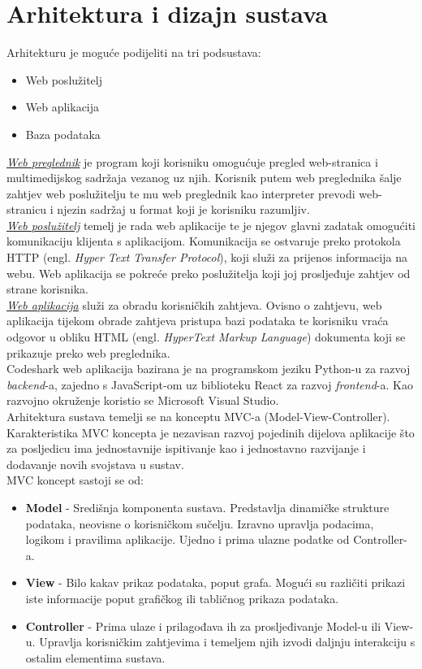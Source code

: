 \chapter{Arhitektura i dizajn sustava}
		
		\noindent Arhitekturu je moguće podijeliti na tri podsustava:
	\begin{itemize}
		\item 	Web poslužitelj
		\item 	Web aplikacija
		\item 	Baza podataka	
	\end{itemize}
		
		\underline{\textit{Web preglednik}} je program koji korisniku omogućuje pregled web-stranica i multimedijskog sadržaja vezanog uz njih. Korisnik putem web preglednika šalje zahtjev web poslužitelju te mu web preglednik kao interpreter prevodi web-stranicu i njezin sadržaj u format koji je korisniku razumljiv. \\
		\underline{\textit{Web poslužitelj}} temelj je rada web aplikacije te je njegov glavni zadatak omogućiti komunikaciju klijenta s aplikacijom. Komunikacija se ostvaruje preko protokola HTTP (engl. \textit{Hyper Text Transfer Protocol}), koji služi za prijenos informacija na webu. Web aplikacija se pokreće preko poslužitelja koji joj prosljeđuje zahtjev od strane korisnika. \\
		\underline{\textit{Web aplikacija}} služi za obradu korisničkih zahtjeva. Ovisno o zahtjevu, web aplikacija tijekom obrade zahtjeva pristupa bazi podataka te korisniku vraća odgovor u obliku HTML (engl. \textit{HyperText Markup Language}) dokumenta koji se prikazuje preko web preglednika. \\
		Codeshark web aplikacija bazirana je na programskom jeziku Python-u za razvoj \textit{backend}-a, zajedno s JavaScript-om uz biblioteku React za razvoj \textit{frontend}-a. Kao razvojno okruženje koristio se Microsoft Visual Studio. \\
		Arhitektura sustava temelji se na konceptu MVC-a (Model-View-Controller). Karakteristika MVC koncepta je nezavisan razvoj pojedinih dijelova aplikacije što za posljedicu ima jednostavnije ispitivanje kao i jednostavno razvijanje i dodavanje novih svojstava u sustav. \\
		
		\noindent MVC koncept sastoji se od:
		
		\begin{itemize}
			\item \textbf{Model} - Središnja komponenta sustava. Predstavlja dinamičke strukture podataka, neovisne o korisničkom sučelju. Izravno upravlja podacima, logikom i pravilima aplikacije. Ujedno i prima ulazne podatke od Controller-a.
			\item \textbf{View} - Bilo kakav prikaz podataka, poput grafa. Mogući su različiti prikazi iste informacije poput grafičkog ili tabličnog prikaza podataka.
			\item \textbf{Controller} - Prima ulaze i prilagođava ih za prosljeđivanje Model-u ili View-u. Upravlja korisničkim zahtjevima i temeljem njih izvodi daljnju interakciju s ostalim elementima sustava.
		\end{itemize}
		
